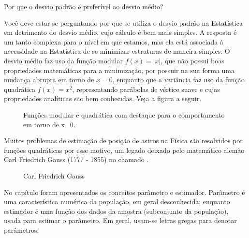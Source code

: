 \begin{observation}{Por que o desvio padrão é preferível ao desvio médio?}

Você deve estar se perguntando por que se utiliza o desvio padrão na Estatística em detrimento do desvio médio, cujo cálculo é bem mais simples. A resposta é um tanto complexa para o nível em que estamos, mas ela está associada à necessidade na Estatística de se minimizar estruturas de maneira simples. O desvio médio faz uso da função modular \(f(x)=|x|\), que não possui boas propriedades matemáticas para a minimização, por possuir na sua forma uma mudança abrupta em torno de \(x=0\),  enquanto que a variância faz uso da função quadrática \(f(x)=x^2\), representando parábolas de vértice suave e cujas propriedades analíticas são bem conhecidas. Veja a figura a seguir.

\begin{figure}[H]
\centering
\capstart

\noindent{}
\caption{Funções modular e quadrática com destaque para o comportamento em torno de x=0.}\label{\detokenize{PE104-4:fig-coloque-aqui-o-nome}}\label{\detokenize{PE104-4:id6}}\end{figure}

Muitos problemas de estimação de posição de astros na Física são resolvidos por funções quadráticas por esse motivo, um legado deixado pelo matemático alemão Carl Friedrich Gauss (1777 - 1855) no chamado  .

\begin{figure}[H]
\centering
\capstart

\noindent{}
\caption{Carl Friedrich Gauss}\label{\detokenize{PE104-4:id1}}\label{\detokenize{PE104-4:id7}}\end{figure}
\end{observation}


No capítulo  foram apresentados os conceitos parâmetro e estimador. Parâmetro é uma característica numérica da população, em geral desconhecida; enquanto estimador é uma função dos dados da amostra (subconjunto da população), usada para estimar o parâmetro. Em geral, usam-se letras gregas para denotar parâmetros.


